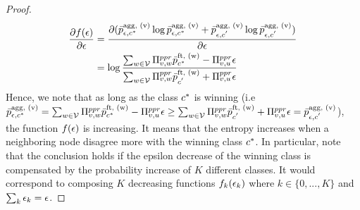 \begin{proof}
\begin{align*}
    \frac{\partial f({\epsilon})}{\partial {\epsilon}} &= \frac{\partial (\bar{p}_{{\epsilon}, c^*}^\text{agg, (v)} \log \bar{p}_{{\epsilon}, c^*}^\text{agg, (v)} + \bar{p}_{{\epsilon}, c^{'}}^\text{agg, (v)} \log \bar{p}_{{\epsilon}, c^{'}}^\text{agg, (v)})}{\partial {\epsilon}}\\
    & = \log\frac{\sum_{w \in \mathcal{V}} \Pi^{ppr}_{v, w} \bar{p}_{c^*}^\text{ft, (w)} - \Pi^{ppr}_{v, u}{\epsilon}}{\sum_{w \in \mathcal{V}} \Pi^{ppr}_{v, w} \bar{p}_{c^{'}}^\text{ft, (w)} + \Pi^{ppr}_{v, u}{\epsilon}}
\end{align*}
Hence, we note that as long as the class $c^*$ is winning (i.e $\bar{p}_{{\epsilon}, c^*}^\text{agg, (v)} = \sum_{w \in \mathcal{V}} \Pi^{ppr}_{v, w} \bar{p}_{c^*}^\text{ft, (w)} - \Pi^{ppr}_{v, u}{\epsilon} \geq \sum_{w \in \mathcal{V}} \Pi^{ppr}_{v, w} \bar{p}_{c^{'}}^\text{ft, (w)} + \Pi^{ppr}_{v, u}{\epsilon} = \bar{p}_{{\epsilon}, c^{'}}^\text{agg, (v)}$), the function $f({\epsilon})$ is increasing. It means that the entropy  increases when a neighboring node disagree more with the winning class $c^*$. In particular, note that the conclusion holds if the epsilon decrease of the winning class is compensated by the probability increase of $K$ different classes. It would correspond to composing $K$ decreasing functions $f_k({\epsilon}_k)$ where $k \in \{0,...,K\}$ and $\sum_k {\epsilon}_k = {\epsilon}$.
\end{proof}

\clearpage

